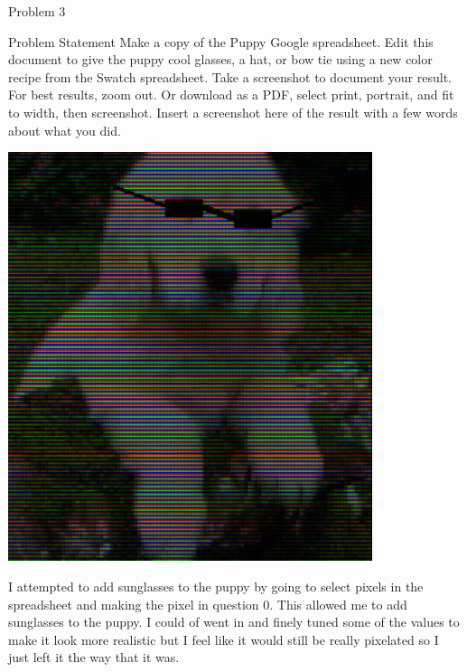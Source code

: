 \begin{problem}{Problem 3}
    \begin{statement}{Problem Statement}
        Make a copy of the Puppy Google spreadsheet. Edit this document to give the puppy cool glasses, a hat, or bow tie using a new color recipe from the Swatch spreadsheet. Take a screenshot to 
        document your result. For best results, zoom out. Or download as a PDF, select print, portrait, and fit to width, then screenshot. Insert a screenshot here of the result with a few words about 
        what you did.
    \end{statement}

    \begin{Highlight}[Solution]
        \begin{center}
            \includegraphics[width = 0.8\textwidth]{Images/Puppy.png}
        \end{center}
        I attempted to add sunglasses to the puppy by going to select pixels in the spreadsheet and making the pixel in question 0. This allowed me to add sunglasses to the puppy. I could of went in and
        finely tuned some of the values to make it look more realistic but I feel like it would still be really pixelated so I just left it the way that it was.
    \end{Highlight}
\end{problem}

